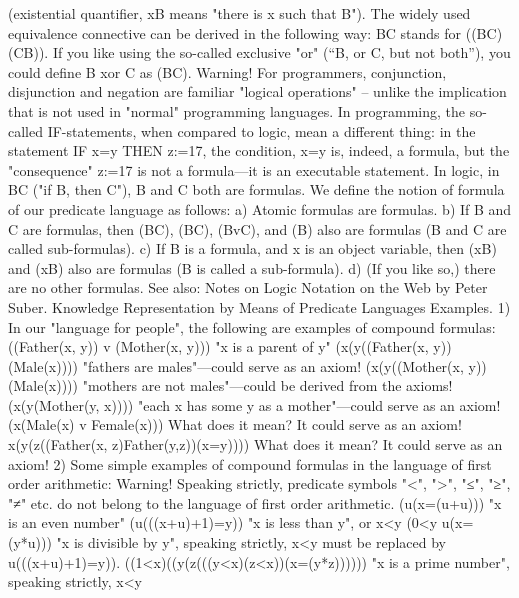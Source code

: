 \exists  (existential quantifier, \exists xB means "there is x such that B").
The widely used equivalence connective \IFF  can be derived in the following way: B\IFF C stands for
((B\IMPLIES C)\AND (C\IMPLIES B)). If you like using the so-called exclusive "or" (``B, or C, but not both''), you could
define B xor C as \neg (B\IFF C).
Warning! For programmers, conjunction, disjunction and negation are familiar "logical operations" –
unlike the implication that is not used in "normal" programming languages. In programming, the so-
called IF-statements, when compared to logic, mean a different thing: in the statement IF x=y THEN
z:=17, the condition, x=y is, indeed, a formula, but the "consequence" z:=17 is not a formula---it is an
executable statement. In logic, in B\IMPLIES C ("if B, then C"), B and C both are formulas.
We define the notion of formula of our predicate language as follows:
a) Atomic formulas are formulas.
b) If B and C are formulas, then (B\IMPLIES C), (B\AND C), (BvC), and (\neg B) also are formulas (B and C are called
sub-formulas).
c) If B is a formula, and x is an object variable, then (\forall xB) and (\exists xB) also are formulas (B is called a
sub-formula).
d) (If you like so,) there are no other formulas.
See also:
Notes on Logic Notation on the Web by Peter Suber.
Knowledge Representation by Means of Predicate Languages
Examples. 1) In our "language for people", the following are examples of compound formulas:
((Father(x, y)) v (Mother(x, y))) "x is a parent of y"
(\forall x(\forall y((Father(x, y)) \IMPLIES  (Male(x)))) "fathers are males"---could serve as an axiom!
(\forall x(\forall y((Mother(x, y)) \IMPLIES  (\neg Male(x)))) "mothers are not males"---could be derived from
                                             the axioms!
(\forall x(\exists y(Mother(y, x)))) "each x has some y as a mother"---could serve as
                            an axiom!
(\forall x(Male(x) v Female(x))) What does it mean? It could serve as an axiom!
\forall x(\forall y(\forall z((Father(x, z)\AND Father(y,z))\IMPLIES (x=y)))) What does it mean? It could serve as an axiom!
2) Some simple examples of compound formulas in the language of first order arithmetic:
Warning! Speaking strictly, predicate symbols "<", ">", "≤", "≥", "≠" etc. do not belong to the language of first order
arithmetic.
(\exists u(x=(u+u))) "x is an even number"
(\exists u(((x+u)+1)=y)) "x is less than y", or x<y
(0<y \AND  \exists u(x=(y*u))) "x is divisible by y", speaking strictly, x<y must
                     be replaced by \exists u(((x+u)+1)=y)).
((1<x)\AND (\neg (\exists y(\exists z(((y<x)\AND (z<x))\AND (x=(y*z)))))) "x is a prime number", speaking strictly, x<y
